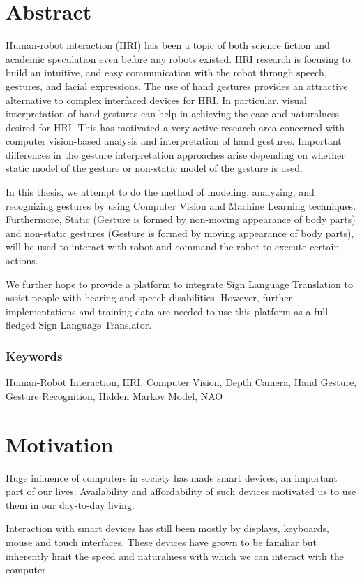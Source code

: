 \chapter{Abstract}
Human-robot interaction (HRI) has been a topic of both science fiction and academic speculation even before any robots existed. HRI research is focusing to build an intuitive, and easy communication with the robot through speech, gestures, and facial expressions. The use of hand gestures provides an attractive alternative to complex interfaced devices for HRI. In particular, visual interpretation of hand gestures can help in achieving the ease and naturalness desired for HRI. This has motivated a very active research area concerned with computer vision-based analysis and interpretation of hand gestures. Important differences in the gesture interpretation approaches arise depending on whether static model of the gesture or non-static model of the gesture is used. 

In this thesis, we attempt to do the method of modeling, analyzing, and recognizing gestures by using Computer Vision and Machine Learning techniques. Furthermore, Static (Gesture is formed by non-moving appearance of body parts) and non-static gestures (Gesture is formed by moving appearance of body parts), will be used to interact with robot and command the robot to execute certain actions.

We further hope to provide a platform to integrate Sign Language Translation to assist people with hearing and speech disabilities. However, further implementations and training data are needed to use this platform as a full fledged Sign Language Translator.

\subsection*{Keywords} Human-Robot Interaction, HRI, Computer Vision, Depth Camera, Hand Gesture, Gesture Recognition, Hidden Markov Model, NAO

\chapter{Motivation} Huge influence of computers in society has made smart devices, an important part of our lives. Availability and affordability of such devices motivated us to use them in our day-to-day living. 

Interaction with smart devices has still been mostly by displays, keyboards, mouse and touch interfaces. These devices have grown to be familiar but inherently limit the speed and naturalness with which we can interact with the computer. 

